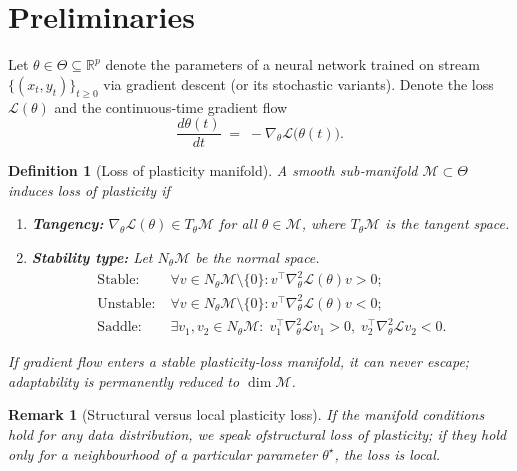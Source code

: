 \documentclass[11pt]{article}
\newcommand{\Loss}{\mathcal{L}}
\newcommand{\R}{\mathbb{R}}
\newtheorem{definition}{Definition}[section]
\newtheorem{remark}{Remark}[section]
\begin{document}
\section{Preliminaries}
\label{sec:framework}

Let $\theta\in\Theta\subseteq\R^p$ denote the parameters of a neural network trained on stream~$\{(x_t,y_t)\}_{t\ge0}$ via gradient descent (or its stochastic variants).  Denote the loss $\Loss(\theta)$ and the continuous‑time gradient flow
\begin{equation}
    \frac{d\theta(t)}{dt} \;=\; -\nabla_\theta\Loss\bigl(\theta(t)\bigr).
\end{equation}

\begin{definition}[Loss of plasticity manifold]
\label{def:lop}
A smooth sub‑manifold $\mathcal{M}\subset\Theta$ induces loss of plasticity if
\begin{enumerate}[label=(\alph*)]
    \item \textbf{Tangency:} $\nabla_\theta\Loss(\theta)\in T_\theta\mathcal{M}$ for all $\theta\in\mathcal{M}$, where $T_\theta\mathcal{M}$ is the tangent space.
    \item \textbf{Stability type:} Let $N_\theta\mathcal{M}$ be the normal space.  \vspace{-4pt}
        \begin{align}
        \text{Stable:}\; &\forall v\in N_\theta\mathcal{M}\setminus\{0\}: v^\top\nabla_\theta^2\Loss(\theta)v > 0; \\
        \text{Unstable:}\; &\forall v\in N_\theta\mathcal{M}\setminus\{0\}: v^\top\nabla_\theta^2\Loss(\theta)v < 0; \\
        \text{Saddle:}\; &\exists v_1,v_2\in N_\theta\mathcal{M}:\; v_1^\top\nabla_\theta^2\Loss v_1>0,\; v_2^\top\nabla_\theta^2\Loss v_2<0.
        \end{align}
\end{enumerate}
If gradient flow enters a stable plasticity‑loss manifold, it can never escape; adaptability is permanently reduced to $\dim\mathcal{M}$.
\end{definition}

\begin{remark}[Structural versus local plasticity loss]
If the manifold conditions hold for any data distribution, we speak ofstructural loss of plasticity; if they hold only for a neighbourhood of a particular parameter $\theta^\star$, the loss is local. 
\end{remark}
\end{document}
